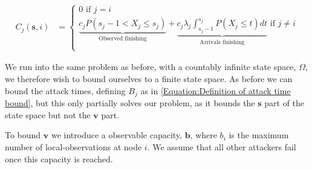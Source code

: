\documentclass[a4paper,10pt]{article}
\theoremstyle{definition}
\theoremstyle{definition}
\theoremstyle{remark}
\theoremstyle{definition}
\begin{document}
\begin{align*}
C_{j}(\bm{s},i) &= \begin{cases}
0  \text{ if } j=i \\
\underbrace{c_{j} P(s_{j}-1 < X_{j} \leq s_{j})}_{\text{Observed finishing}} + \underbrace{c_{j} \lambda_{j} \int_{s_{j}-1}^{s_{j}} P(X_{j} \leq t) dt}_{\text{Arrivals finishing}} \text{ if } j \neq i \\
\end{cases}
\end{align*}

We run into the same problem as before, with a countably infinite state space, $\Omega$, we therefore wish to bound ourselves to a finite state space. As before we can bound the attack times, defining $B_{j}$ as in \ref{Equation:Definition of attack time bound}, but this only partially solves our problem, as it bounds the $\bm{s}$ part of the state space but not the $\bm{v}$ part.

To bound $\bm{v}$ we introduce a observable capacity, $\bm{b}$, where $b_{i}$ is the maximum number of local-observations at node $i$. We assume that all other attackers fail once this capacity is reached.
\end{document}
